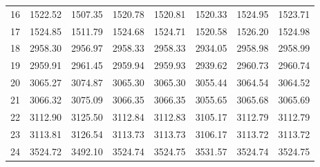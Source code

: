 \documentclass[10pt,oneside]{article}
\begin{document}
\begin{table}[h!]
\begin{tabular}{cccccccc}
16 &   1522.52 & 1507.35 & 1520.78 & 1520.81 &      1520.33 & 1524.95 & 1523.71 \\
17 &   1524.85 & 1511.79 & 1524.68 & 1524.71 &      1520.58 & 1526.20 & 1524.98 \\
18 &   2958.30 & 2956.97 & 2958.33 & 2958.33 &      2934.05 & 2958.98 & 2958.99 \\
19 &   2959.91 & 2961.45 & 2959.94 & 2959.93 &      2939.62 & 2960.73 & 2960.74 \\
20 &   3065.27 & 3074.87 & 3065.30 & 3065.30 &      3055.44 & 3064.54 & 3064.52 \\
21 &   3066.32 & 3075.09 & 3066.35 & 3066.35 &      3055.65 & 3065.68 & 3065.69 \\
22 &   3112.90 & 3125.50 & 3112.84 & 3112.83 &      3105.17 & 3112.79 & 3112.79 \\
23 &   3113.81 & 3126.54 & 3113.73 & 3113.73 &      3106.17 & 3113.72 & 3113.72 \\
24 &   3524.72 & 3492.10 & 3524.74 & 3524.75 &      3531.57 & 3524.74 & 3524.75 \\
\bottomrule
\end{tabular}
\end{table}

\clearpage
\end{document}
